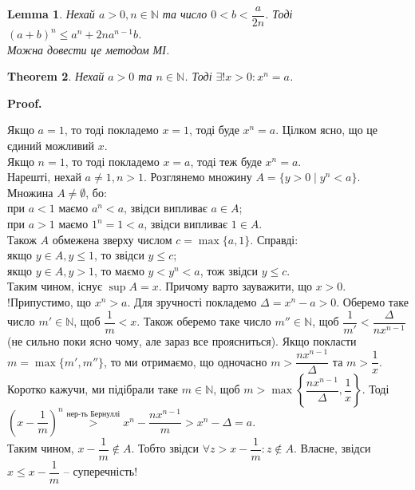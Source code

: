 \documentclass[a4paper, 14pt]{article}
\makeatletter
\def\qed{$\blacksquare$}
\theoremstyle{theoremdd}
\newtheorem{theorem}{Theorem}[subsection]
\theoremstyle{theoremdd}
\theoremstyle{theoremdd}
\theoremstyle{theoremdd}
\theoremstyle{theoremdd}
\theoremstyle{theoremdd}
\theoremstyle{theoremdd}
\newtheorem{lemma}[theorem]{Lemma}
\theoremstyle{theoremdd}
\renewenvironment{proof}[1][Proof.\\]{\par
\pushQED{\hfill \qed}%
\normalfont \topsep6\p@\@plus6\p@\relax
\trivlist
\item\relax
{\bfseries
#1\@addpunct{.}}\hspace\labelsep\ignorespaces
}{%
\popQED\endtrivlist\@endpefalse
}
\makeatother
\begin{document}
	\begin{lemma}
	Нехай $a > 0, n \in \mathbb{N}$ та число $0 < b < \dfrac{a}{2n}$. Тоді $(a+b)^n \leq a^n + 2na^{n-1}b$.\\
	\textit{Можна довести це методом МІ}.
	\end{lemma}
	
	\begin{theorem}
	Нехай $a > 0$ та $n \in \mathbb{N}$. Тоді $\exists ! x > 0: x^n = a$.
	\end{theorem}
	
	\begin{proof}
	Якщо $a = 1$, то тоді покладемо $x = 1$, тоді буде $x^n = a$. Цілком ясно, що це єдиний можливий $x$.\\
	Якщо $n = 1$, то тоді покладемо $x = a$, тоді теж буде $x^n = a$.\\
	Нарешті, нехай $a \neq 1, n > 1$. Розглянемо множину $A = \{y > 0 \mid y^n < a\}$. Множина $A \neq \emptyset$, бо:\\
	при $a < 1$ маємо $a^n < a$, звідси випливає $a \in A$;\\
	при $a > 1$ маємо $1^n = 1 < a$, звідси випливає $1 \in A$.\\
	Також $A$ обмежена зверху числом $c = \max\{a,1\}$. Справді:\\
	якщо $y \in A, y \leq 1$, то звідси $y \leq c$;\\
	якщо  $y \in A, y > 1$, то маємо $y < y^n < a$, тож звідси $y \leq c$.\\
	Таким чином, існує $\sup A = x$. Причому варто зауважити, що $x > 0$.
	\bigskip \\
	!Припустимо, що $x^n > a$. Для зручності покладемо $\Delta = x^n - a > 0$. Оберемо таке число $m' \in \mathbb{N}$, щоб $\dfrac{1}{m} < x$. Також оберемо таке число $m'' \in \mathbb{N}$, щоб $\dfrac{1}{m'} < \dfrac{\Delta}{nx^{n-1}}$ (не сильно поки ясно чому, але зараз все проясниться). Якщо покласти $m = \max\{m',m''\}$, то ми отримаємо, що одночасно $m > \dfrac{nx^{n-1}}{\Delta}$ та $m > \dfrac{1}{x}$. Коротко кажучи, ми підібрали таке $m \in \mathbb{N}$, щоб $m > \max\left\{ \dfrac{nx^{n-1}}{\Delta}, \dfrac{1}{x} \right\}$. Тоді\\
	$\left(x - \dfrac{1}{m}\right)^n \overset{\text{нер-ть Бернуллі}}{>} x^n - \dfrac{nx^{n-1}}{m} > x^n - \Delta = a$.\\

	Таким чином, $x-\dfrac{1}{m} \notin A$. Тобто звідси $\forall z > x - \dfrac{1}{m}: z \notin A$. Власне, звідси $x \leq x - \dfrac{1}{m}$ -- суперечність!

\end{proof}
\end{document}
